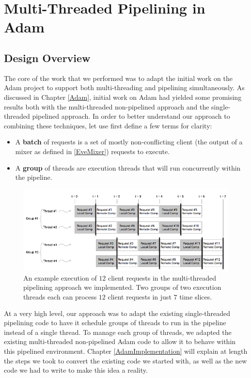 \documentclass[11pt, oneside]{report}
\begin{document}
\chapter{Multi-Threaded Pipelining in Adam}\label{AdamDesign}

\section{Design Overview}

The core of the work that we performed was to adapt the initial work on the Adam project to support both multi-threading and pipelining simultaneously.
As discussed in Chapter \ref{Adam}, initial work on Adam had yielded some promising results both with the multi-threaded non-pipelined approach and the single-threaded pipelined approach. 
In order to better understand our approach to combining these techniques, let use first define a few terms for clarity:
\begin{itemize}
\item A \textbf{batch} of requests is a set of mostly non-conflicting client (the output of a mixer as defined in \ref{EveMixer}) requests to execute.
\item A \textbf{group} of threads are execution threads that will run concurrently within the pipeline.
\end{itemize}

\begin{figure}[h]
\centering
\includegraphics[width=1.0\textwidth]{PipelinedParallel.png}
\caption{\label{parpipe}An example execution of $12$ client requests in the multi-threaded pipelining approach we implemented. Two groups of two execution threads each can process $12$ client requests in just $7$ time slices.}
\end{figure}

At a very high level, our approach was to adapt the existing single-threaded pipelining code to have it schedule groups of threads to run in the pipeline instead of a single thread. 
To manage each group of threads, we adapted the existing multi-threaded non-pipelined Adam code to allow it to behave within this pipelined environment. 
Chapter \ref{AdamImplementation} will explain at length the steps we took to convert the existing code we started with, as well as the new code we had to write to make this idea a reality.
\end{document}

